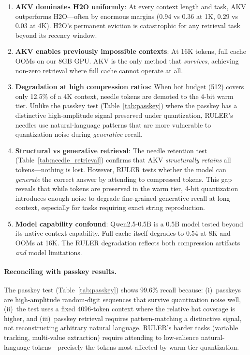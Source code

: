 \documentclass[11pt,a4paper]{article}
\begin{document}
\begin{enumerate}
    \item \textbf{AKV dominates H2O uniformly}: At every context length and task, AKV outperforms H2O---often by enormous margins (0.94 vs 0.36 at 1K, 0.29 vs 0.03 at 4K). H2O's permanent eviction is catastrophic for any retrieval task beyond its recency window.

    \item \textbf{AKV enables previously impossible contexts}: At 16K tokens, full cache OOMs on our 8GB GPU. AKV is the only method that \textit{survives}, achieving non-zero retrieval where full cache cannot operate at all.

    \item \textbf{Degradation at high compression ratios}: When hot budget (512) covers only 12.5\% of a 4K context, needle tokens are demoted to the 4-bit warm tier. Unlike the passkey test (Table~\ref{tab:passkey}) where the passkey has a distinctive high-amplitude signal preserved under quantization, RULER's needles use natural-language patterns that are more vulnerable to quantization noise during \textit{generative} recall.

    \item \textbf{Structural vs generative retrieval}: The needle retention test (Table~\ref{tab:needle_retrieval}) confirms that AKV \textit{structurally retains} all tokens---nothing is lost. However, RULER tests whether the model can \textit{generate} the correct answer by attending to compressed tokens. This gap reveals that while tokens are preserved in the warm tier, 4-bit quantization introduces enough noise to degrade fine-grained generative recall at long context, especially for tasks requiring exact string reproduction.

    \item \textbf{Model capability confound}: Qwen2.5-0.5B is a 0.5B model tested beyond its native context capability. Full cache itself degrades to 0.54 at 8K and OOMs at 16K. The RULER degradation reflects both compression artifacts \textit{and} model limitations.
\end{enumerate}

\paragraph{Reconciling with passkey results.} The passkey test (Table~\ref{tab:passkey}) shows 99.6\% recall because: (i)~passkeys are high-amplitude random-digit sequences that survive quantization noise well, (ii)~the test uses a fixed 4096-token context where the relative hot coverage is higher, and (iii)~passkey retrieval requires pattern-matching a distinctive signal, not reconstructing arbitrary natural language. RULER's harder tasks (variable tracking, multi-value extraction) require attending to low-salience natural-language tokens---precisely the tokens most affected by warm-tier quantization.
\end{document}
